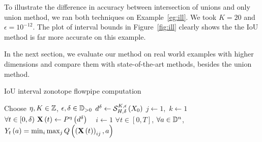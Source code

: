 %
\begin{example}
To illustrate the difference in accuracy between intersection of
unions and only union method, we ran both techniques on
Example~\ref{eg:ill}.  We took $K=20$ and $\epsilon = 10^{-12}$.  The
plot of interval bounds in Figure~\ref{fig:ill} clearly shows the the
IoU method is far more accurate on this example.  
\end{example}
In the next section,
we evaluate our method on real world examples with higher dimensions
and compare them with state-of-the-art methods, besides the union
method.
%
\begin{algorithm}
\caption{IoU interval zonotope
flowpipe computation}\label{alg:main}
\DontPrintSemicolon
{}


Choose $\eta,K\in\mathbb{Z}$, $\epsilon,\delta\in\mathbb{D}_{>0}$\;
$d^\delta \gets \mathcal{S}_{H,\delta}^{K,\epsilon}\left(X_0\right)$\;
$j\gets 1$,~$k\gets 1$\;~\label{algstep:assign1}
$\forall t\in[0,\delta)~\mathbf{X}\left(t\right)\gets P^{\eta}\left(d^\delta\right)$\; ~\label{algstep:assign2}
$i\gets 1$\;
\While{$i\delta\leq N$}{
\For{ $j\in \rows{\iouopt{\eta}{X_0}}$ \text{and} $k\in\cols{\iouopt{\eta}{X_0}}$~(in parallel)}{
$\rb{\tr{X}{i\delta}}_{jk} \gets \flow{H}{\delta}{K}{\epsilon}{\rb{\tr{X}{(i-1)\delta}}_{jk}}$~\label{step:1}
}
$\tr{X}{i\delta} \gets \refine\rb{\tr{X}{(i)\delta}}$\;
$\forall t\in[0,t)~\tr{X}{t} \gets \tr{X}{(i)\delta}$\; ~\label{step:2}
$i \gets i+1$\;
}
$\forall t\in[0,T]$, $\forall a\in\mathbb{D}^n$, $Y_{t}\left(a\right)
= \min_i\max_jQ\left(\left(\mathbf{X}\left(t\right)\right)_{ij},a\right)$~\label{step:proj}
\end{algorithm}
%
